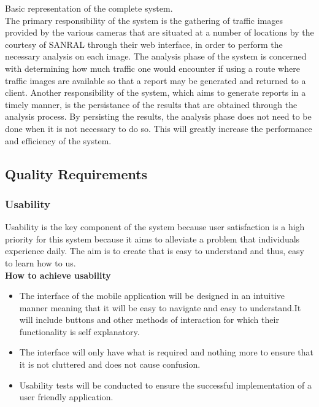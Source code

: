 \documentclass[a4paper,12pt]{article}
\begin{document}
Basic representation of the complete system.\\

The primary responsibility of the system is the gathering of traffic images provided by the various cameras that are situated at a number of locations by the courtesy of SANRAL through their web interface, in order to perform the necessary analysis on each image. The analysis phase of the system is concerned with determining how much traffic one would encounter if using a route where traffic images are available so that a report may be generated and returned to a client.
Another responsibility of the system, which aims to generate reports in a timely manner, is the persistance of the results that are obtained through the analysis process. By persisting the results, the analysis phase does not need to be done when it is not necessary to do so. This will greatly increase the performance and efficiency of the system.
\subsection{Quality Requirements}
\subsubsection{Usability}
Usability is the key component of the system because user satisfaction is a high priority for this system because it aims to alleviate a problem that individuals experience daily. The aim is to create that is easy to understand and thus, easy to learn how to us. \\
\textbf{How to achieve usability}
\begin{itemize}
\item The interface of the mobile application will be designed in an intuitive manner meaning that it will be easy to navigate and easy to understand.It will include buttons and other methods of interaction for which their functionality is self explanatory.
\item The interface will only have what is required and nothing more to ensure that it is not cluttered and does not cause confusion.
\item Usability tests will be conducted to ensure the successful implementation of a user friendly application.
\end{itemize}
\end{document}
